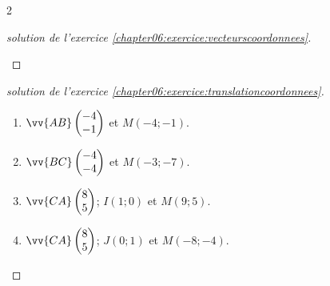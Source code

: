 \begin{multicols}{2}
\begin{proof}[solution de l'exercice \ref{chapter06:exercice:vecteurscoordonnees}]
\begin{enumerate}[leftmargin=*,label=\alph*)]
		\end{enumerate} 
	\end{proof}
	\begin{proof}[solution de l'exercice \ref{chapter06:exercice:translationcoordonnees}]\hfill 
		\begin{enumerate}[leftmargin=*,label=\alph*)] 
			\item  $\vv{AB}\begin{pmatrix}
				-4\\-1
			\end{pmatrix}$ et $M(-4;-1)$.
			\item  $\vv{BC}\begin{pmatrix}
				-4\\-4
			\end{pmatrix}$ et $M(-3;-7)$.
			\item  $\vv{CA}\begin{pmatrix}
				8\\5
			\end{pmatrix}$; $I(1;0)$ et $M(9;5)$.
			\item $\vv{CA}\begin{pmatrix}
				8\\5
			\end{pmatrix}$; $J(0;1)$ et $M(-8;-4)$.
		\end{enumerate} 
	\end{proof} 
\end{multicols}
